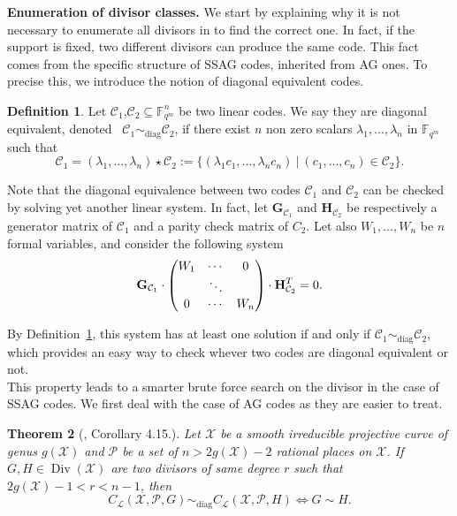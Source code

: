 \documentclass[10pt]{article}
\newtheorem{thm}{Theorem}
\theoremstyle{definition}
\theoremstyle{definition}
\theoremstyle{definition}
\newtheorem{def1}[thm]{Definition}
\newcommand{\cd}{\cdot}
\newcommand{\C}{\mathcal{C}}
\newcommand{\Fqm}{\mathbb{F}_{q^m}}
\newcommand{\su}{\subseteq}
\newcommand{\X}{\mathcal{X}}
\newcommand{\PR}{\mathcal{P}}
\newcommand{\Div}{\operatorname{Div}}
\newcommand{\calL}{\mathcal{L}}
\begin{document}
 \textbf{Enumeration of divisor classes.} We start by explaining why it is not necessary to enumerate all divisors in to find the correct one. In fact, if the support is fixed, two different divisors can produce the same code. This fact comes from the specific structure of SSAG codes, inherited from AG ones. To precise this, we introduce the notion of diagonal equivalent codes.

\begin{def1} \label{diag}
Let $\C_1$,$\C_2 \su \Fqm^n$ be two linear codes. We say they are diagonal equivalent, denoted \ $\C_1 \sim_{\mathrm{diag}} \C_2$, if there exist $n$ non zero scalars $\lambda_1,...,\lambda_n$ in $\Fqm$ such that 
\[\C_1 = (\lambda_1,...,\lambda_n) \star \C_2 := \{(\lambda_1c_1,...,\lambda_nc_n) \ | \ (c_1,...,c_n) \in \C_2\}.\]
\end{def1} 

Note that the diagonal equivalence between two codes $\C_1$ and $\C_2$ can be checked by solving yet another linear system. In fact, let $\mathbf{G}_{\C_1}$ and $\mathbf{H}_{\C_2}$ be respectively a generator matrix of $\C_1$ and a parity check matrix of $C_2$. Let also $W_1,...,W_n$ be $n$ formal variables, and consider the following system
\begin{equation} \label{equiv}
\mathbf{G}_{\C_1} \cd \begin{pmatrix}
W_1 & \cdots & 0 \\
\null & \ddots & \null \\
0 & \cdots & W_n
\end{pmatrix} \cd \mathbf{H}_{\C_2}^T = 0.
\end{equation}

 By Definition~\ref{diag}, this system has at least one solution if and only if $\C_1 \sim_{\mathrm{diag}} \C_2$, which provides an easy way to check whever two codes are diagonal equivalent or not. \\
This property leads to a smarter brute force search on the divisor in the case of SSAG codes. We first deal with the case of AG codes as they are easier to treat. 

\begin{thm} [\cite{CMRP}, Corollary 4.15.]  \label{thmequiv}
Let $\X$ be a smooth irreducible projective curve of genus $g(\X)$ and $\PR$ be a set of $n>2g(\X)-2$ rational places on $\X$. If $G,H \in \Div(\X)$ are two divisors of same degree $r$ such that $2g(\X)-1 < r < n-1$, then  
\[C_{\calL}(\X,\PR,G) \sim_{\mathrm{diag}} C_{\calL}(\X,\PR,H) \iff G \sim H.\]
\end{thm}
\end{document}
